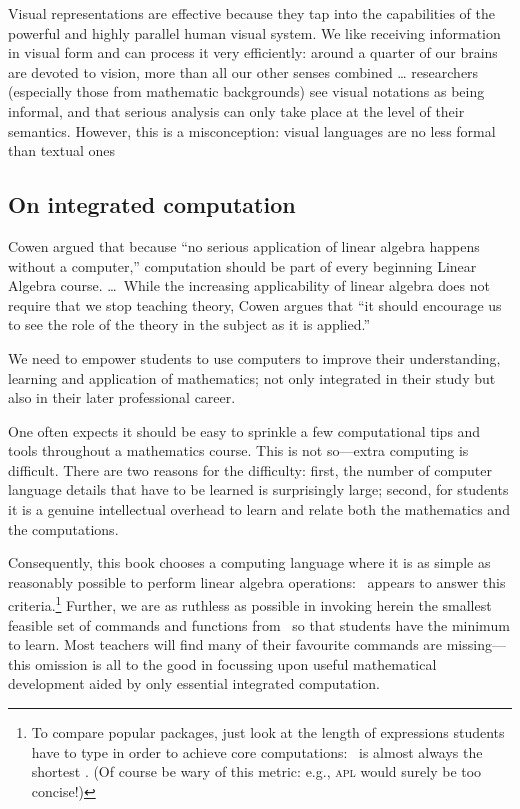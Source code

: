 \begin{quoted}{\cite{Moody2009}}
Visual representations are effective because they tap into the capabilities of the powerful and highly parallel human visual system.
We like receiving information in visual form and can process it very efficiently: around a quarter of our brains are devoted to vision, more than all our other senses combined  \ldots
researchers (especially those from mathematic backgrounds) see visual notations as being informal, and that serious analysis can only take place at the level of their semantics. 
However, this is a misconception: visual languages are no less formal than textual ones
\end{quoted}









\subsection*{On integrated computation}

\begin{quoted}{\cite[p.38]{CUPMguide2015}}
Cowen argued that because ``no serious application of linear algebra happens without a computer,'' computation should be part of every beginning Linear Algebra course. \ldots\
While the increasing applicability of linear algebra does not require that we stop teaching theory, Cowen argues that ``it should encourage us to see the role of the theory in the subject as it is applied.''
\end{quoted}


We need to empower students to use computers to improve their understanding, learning and application of mathematics; not only integrated in their study but also in their later professional career.

One often expects it should be easy to sprinkle a few computational tips and tools throughout a mathematics course.
This is not so---extra computing is difficult.
There are two reasons for the difficulty: 
first, the number of computer language details that have to be learned is surprisingly large;
second, for students it is a genuine intellectual overhead to learn and relate both the mathematics and the computations.

Consequently, this book chooses a computing language where it is as simple as reasonably possible to perform linear algebra operations: \script\ appears to answer this criteria.\footnote{To compare popular packages, just look at the length of expressions students have to type in order to achieve core computations: \script\ is almost always the shortest \cite[e.g.]{Nakos1998}.  
(Of course be wary of this metric: e.g., \textsc{apl} would surely be too concise!)}
Further, we are as ruthless as possible in invoking herein the smallest feasible set of commands and functions from \script\ so that  students have the minimum to learn.
Most teachers will find many of their favourite commands are missing---this omission is all to the good in focussing upon useful mathematical development aided by only essential integrated computation.

